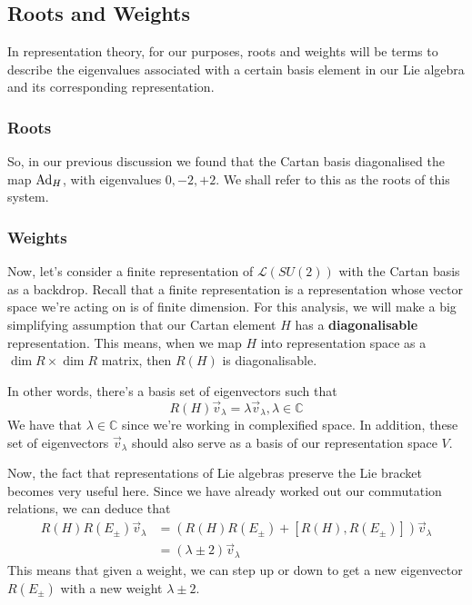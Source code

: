 \subsection{Roots and Weights}
In representation theory, for our purposes, roots and weights will be
terms to describe the eigenvalues associated with a certain 
basis element in our Lie algebra and its corresponding
representation. 

\subsubsection{Roots} 
So, in our previous discussion we found that 
the Cartan basis diagonalised the map $\text{Ad}_ H $, 
with eigenvalues $0 , -2 , +2$. We shall refer 
to this as the roots of this system.

\subsubsection{Weights} 
Now, let's consider a finite representation of $\mathcal{ L } ( SU ( 2) ) $
with the Cartan basis as a backdrop. Recall that a finite 
representation is a representation whose vector space we're 
acting on is of finite dimension. 
For this analysis, we will make a big simplifying assumption that 
our Cartan element $ H $ has a \textbf{diagonalisable} representation. 
This means, when we map $ H $ into representation space as a 
$ \dim R \times \dim R $ matrix, then $ R ( H ) $ is diagonalisable. 

In other words, there's a basis set of eigenvectors such that 
\[
	R ( H ) \vec{v}_ \lambda = \lambda \vec{v}_{ \lambda } , \lambda \in \mathbb{ C}  
\]  We have that 
$ \lambda \in \mathbb{ C}  $  since we're working 
in complexified space. In addition, these set of eigenvectors $ \vec{v} _ \lambda$ should
also serve as a basis of our representation space $ V$.

Now, the fact that representations of Lie algebras
preserve the Lie bracket becomes very useful here. 
Since we have already worked out our commutation relations, 
we can deduce that 
\begin{align*}
	R ( H ) R ( E_{\pm } ) \vec{v}_{ \lambda } &=  
	\left( R( H ) R ( E_{\pm } ) + [ R ( H ) , R ( E_{ \pm } ) ] \right) \vec{v}_\lambda   \\
						   &=  ( \lambda \pm 2 ) \vec{v}_ \lambda  
\end{align*}
This means that given a weight, we can step up or down to get a new 
eigenvector $ R ( E_{ \pm } ) $ with a new weight 
$ \lambda \pm 2 $. 
